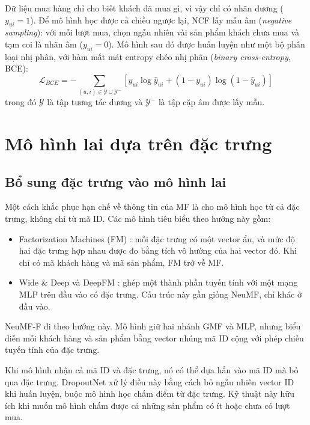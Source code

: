 Dữ liệu mua hàng chỉ cho biết khách đã mua gì, vì vậy chỉ có nhãn dương ($y_{ui} = 1$). Để mô hình học được cả chiều ngược lại, NCF lấy mẫu âm (\textit{negative sampling}): với mỗi lượt mua, chọn ngẫu nhiên vài sản phẩm khách chưa mua và tạm coi là nhãn âm ($y_{ui} = 0$). Mô hình sau đó được huấn luyện như một bộ phân loại nhị phân, với hàm mất mát entropy chéo nhị phân (\textit{binary cross-entropy}, BCE):
\begin{equation}
    \mathcal{L}_{BCE} = -\sum_{(u, i) \in \mathcal{Y} \cup \mathcal{Y}^-} \left[ y_{ui} \log \hat{y}_{ui} + (1 - y_{ui}) \log (1 - \hat{y}_{ui}) \right]
    \label{eq:bce_loss}
\end{equation}
trong đó $\mathcal{Y}$ là tập tương tác dương và $\mathcal{Y}^-$ là tập cặp âm được lấy mẫu.

\section{Mô hình lai dựa trên đặc trưng}
\label{sec:modern_trends}

\subsection{Bổ sung đặc trưng vào mô hình lai}
\label{subsec:deep_ctr}

Một cách khắc phục hạn chế về thông tin của MF là cho mô hình học từ cả đặc trưng, không chỉ từ mã ID. Các mô hình tiêu biểu theo hướng này gồm:
\begin{itemize}
    \item Factorization Machines (FM) \parencite{rendle2010fm}: mỗi đặc trưng có một vector ẩn, và mức độ hai đặc trưng hợp nhau được đo bằng tích vô hướng của hai vector đó. Khi chỉ có mã khách hàng và mã sản phẩm, FM trở về MF.
    \item Wide \& Deep \parencite{cheng2016wide} và DeepFM \parencite{guo2017deepfm}: ghép một thành phần tuyến tính với một mạng MLP trên đầu vào có đặc trưng. Cấu trúc này gần giống NeuMF, chỉ khác ở đầu vào.
\end{itemize}

NeuMF-F đi theo hướng này. Mô hình giữ hai nhánh GMF và MLP, nhưng biểu diễn mỗi khách hàng và sản phẩm bằng vector nhúng mã ID cộng với phép chiếu tuyến tính của đặc trưng.

Khi mô hình nhận cả mã ID và đặc trưng, nó có thể dựa hẳn vào mã ID mà bỏ qua đặc trưng. DropoutNet \parencite{volkovs2017dropoutnet} xử lý điều này bằng cách bỏ ngẫu nhiên vector ID khi huấn luyện, buộc mô hình học chấm điểm từ đặc trưng. Kỹ thuật này hữu ích khi muốn mô hình chấm được cả những sản phẩm có ít hoặc chưa có lượt mua.

